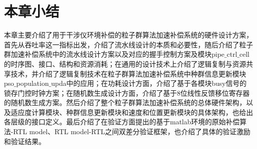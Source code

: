 \section{本章小结}
本章主要介绍了用于干涉仪环境补偿的粒子群算法加速补偿系统的硬件设计方案，首先从吞吐率这一指标出发，介绍了流水线设计的本质和必要性，随后介绍了粒子群加速补偿系统中的流水线设计方案以及对应的握手控制方案及模块pipe$\_$ctrl$\_$cell的时序图、接口、结构和资源消耗；在通用的设计技术上介绍了逻辑复制与资源共享技术，并介绍了逻辑复制技术在粒子群算法加速补偿系统中种群信息更新模块pso$\_$population$\_$upda中的应用；在功耗设计方面，介绍了基于各模块busy信号的锁存门控时钟方案；在随机数生成设计方面，介绍了基于8位线性反馈移位寄存器的随机数生成方案。然后介绍了整个粒子群算法加速补偿系统的总体硬件架构，以及适应度计算模块、种群信息更新模块和速度和位置更新模块的具体架构，也给出各层级的接口定义。最后介绍了在验证方面提出的基于matlab环境的原始补偿算法-RTL model、RTL model-RTL之间双差分验证框架，也介绍了具体的验证激励和验证结果。
